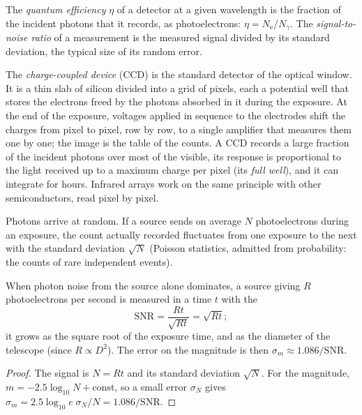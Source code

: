 \begin{definition}\label{def:b1:observing-the-sky:detector}
The \emph{quantum efficiency} $\eta$ of a detector
at a given wavelength is the fraction of the incident photons that it
records, as photoelectrons: $\eta = N_\mathrm{e}/N_\gamma$. The
\emph{signal-to-noise ratio} of a measurement
is the measured signal divided by its standard deviation, the typical size
of its random error.
\end{definition}

The \emph{charge-coupled device} (CCD) is the standard detector of the
optical window. It is a thin slab of silicon divided into a grid of pixels,
each a potential well that stores the electrons freed by the photons
absorbed in it during the exposure. At the end of the exposure, voltages
applied in sequence to the electrodes shift the charges from pixel to pixel,
row by row, to a single amplifier that measures them one by one; the image
is the table of the counts. A CCD records a large fraction of the incident
photons over most of the visible, its response is proportional to the light
received up to a maximum charge per pixel (its \emph{full well}), and it can
integrate for hours. Infrared arrays work on the same principle with other
semiconductors, read pixel by pixel.

Photons arrive at random. If a source sends on average $N$ photoelectrons
during an exposure, the count actually recorded fluctuates from one exposure
to the next with the standard deviation $\sqrt N$ (Poisson statistics,
admitted from probability: the counts of rare independent events).

\begin{proposition}\label{prop:b1:observing-the-sky:snr}
When photon noise from the source alone dominates, a source giving $R$
photoelectrons per second is measured in a time $t$ with the
\[
  \mathrm{SNR} = \frac{Rt}{\sqrt{Rt}} = \sqrt{Rt} ;
\]
it grows as the square root of the exposure time, and as the diameter of
the telescope (since $R \propto D^2$). The error on the magnitude is then
$\sigma_m \approx 1.086/\mathrm{SNR}$.
\end{proposition}

\begin{proof}
The signal is $N = Rt$ and its standard deviation $\sqrt N$. For the
magnitude, $m = -2.5\log_{10}N + \text{const}$, so a small error $\sigma_N$
gives $\sigma_m = 2.5\log_{10}e\;\sigma_N/N = 1.086/\mathrm{SNR}$.
\end{proof}

